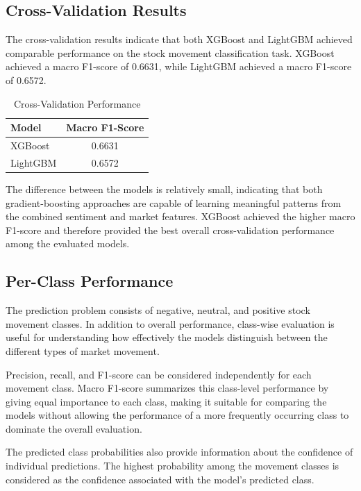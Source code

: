 \documentclass[11pt,a4paper]{article}
\begin{document}
\subsection{Cross-Validation Results}

The cross-validation results indicate that both XGBoost and LightGBM achieved
comparable performance on the stock movement classification task. XGBoost
achieved a macro F1-score of 0.6631, while LightGBM achieved a macro F1-score
of 0.6572.

\begin{table}[h]
\centering
\caption{Cross-Validation Performance}
\begin{tabular}{lc}
\hline
\textbf{Model} & \textbf{Macro F1-Score} \\
\hline
XGBoost & 0.6631 \\
LightGBM & 0.6572 \\
\hline
\end{tabular}
\end{table}

The difference between the models is relatively small, indicating that both
gradient-boosting approaches are capable of learning meaningful patterns from
the combined sentiment and market features. XGBoost achieved the higher macro
F1-score and therefore provided the best overall cross-validation performance
among the evaluated models.

\subsection{Per-Class Performance}

The prediction problem consists of negative, neutral, and positive stock
movement classes. In addition to overall performance, class-wise evaluation
is useful for understanding how effectively the models distinguish between
the different types of market movement.

Precision, recall, and F1-score can be considered independently for each
movement class. Macro F1-score summarizes this class-level performance by
giving equal importance to each class, making it suitable for comparing the
models without allowing the performance of a more frequently occurring class
to dominate the overall evaluation.

The predicted class probabilities also provide information about the
confidence of individual predictions. The highest probability among the
movement classes is considered as the confidence associated with the model's
predicted class.
\end{document}
